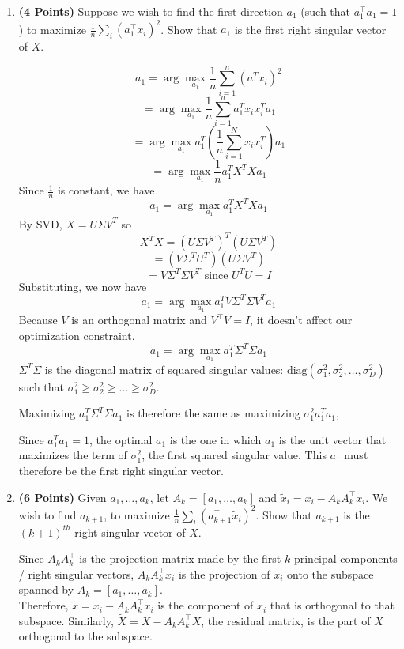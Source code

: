 \documentclass[a4paper]{article}
\theoremstyle{definition}
\newenvironment{soln}{
	\leavevmode\color{blue}\ignorespaces
}{}
\begin{document}
\begin{enumerate}

\item  \textbf{(4 Points)}
Suppose we wish to find the first direction $a_1$ (such that $a_1^\top a_1 = 1$) to maximize $\frac{1}{n} \sum_i (a_1^\top x_i)^2$.
Show that $a_1$ is the first right singular vector of $X$.

\begin{soln}
	$$a_1 = \arg \max_{a_1} \frac{1}{n} \sum_{i=1}^n (a_1^T x_i)^2$$
	$$ = \arg \max_{a_1} \frac{1}{n} \sum_{i=1}^n a_1^T x_i x_i^T a_1$$
	$$ = \arg \max_{a_1} a_1^T \left( \frac{1}{n} \sum_{i=1}^N x_i x_i^T \right) a_1$$
	$$ = \arg \max_{a_1} \frac{1}{n} a_1^T X^T X a_1$$
	Since $\frac{1}{n}$ is constant, we have
	$$a_1 = \arg \max_{a_1} a_1^T X^T X a_1$$
	By SVD, $X = U \Sigma V^T$ so 
	$$X^T X = (U \Sigma V^T)^T(U \Sigma V^T)$$
	$$ = (V \Sigma^T U^T)(U \Sigma V^T)$$
	$$ = V \Sigma^T \Sigma V^T \text{ since } U^T U = I$$
	Substituting, we now have
	$$a_1 = \arg \max_{a_1} a_1^T V \Sigma^T \Sigma V^T a_1$$
	Because $V$ is an orthogonal matrix and $V^\top V = I$, it doesn't affect our optimization constraint.
	$$a_1 = \arg \max_{a_1} a_1^T \Sigma^T \Sigma a_1$$
	$\Sigma^T \Sigma$ is the diagonal matrix of squared singular values: $\text{diag}(\sigma_1^2, \sigma_2^2, \ldots ,\sigma_D^2)$
	such that $\sigma_1^2 \geq \sigma_2^2 \geq \ldots \geq \sigma_D^2$.
	
	Maximizing $a_1^T \Sigma^T \Sigma a_1$ is therefore the same as maximizing $\sigma_1^2 a_1^T a_1$,
	
	Since $a_1^T a_1 = 1$, the optimal $a_1$ is the one in which $a_1$ is the unit vector that maximizes the term of $\sigma_1^2$, the first squared singular value. This $a_1$ must therefore be the first right singular vector.
\end{soln}

\item  \textbf{(6 Points)}
Given $a_1, \dots, a_k$, let $A_k = [a_1, \dots, a_k]$ and 
$\tilde{x}_i = x_i - A_kA_k^\top x_i$. We wish to find $a_{k+1}$, to maximize
$\frac{1}{n} \sum_i (a_{k+1}^\top \tilde{x}_i)^2$. Show that $a_{k+1}$ is the
$(k+1)^{th}$ right singular vector of $X$.

\begin{soln}
	Since $A_k A_k^\top$ is the projection matrix made by the first $k$ principal components / right singular vectors, $A_k A_k^\top x_i$ is the projection of $x_i$ onto the subspace spanned by $A_k = [a_1, \dots, a_k]$. \\
	Therefore, $\tilde{x} = x_i - A_k A_k^\top x_i$ is the component of $x_i$ that is orthogonal to that subspace. Similarly, $\tilde{X} = X - A_k A_k^\top X$, the residual matrix, is the part of $X$ orthogonal to the subspace.
	

\end{soln}
\end{enumerate}
\end{document}
